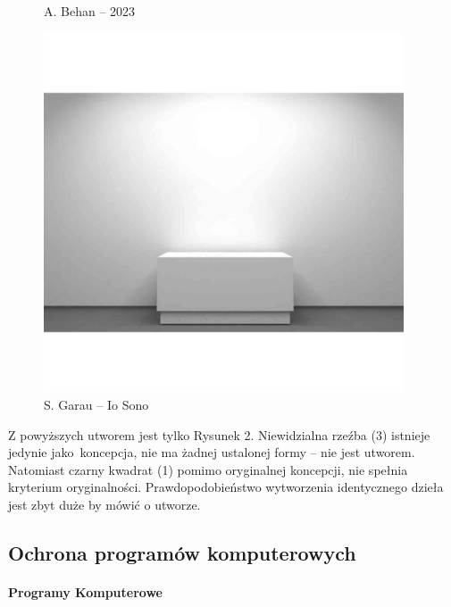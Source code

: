 \documentclass{article}
\begin{document}
\begin{figure}[h]
\begin{minipage}{0.31\textwidth}
    \vspace{-\baselineskip}
    \caption{A. Behan -- 2023}\label{fig:behandomek}
  \end{minipage}
  \hfill
  \begin{minipage}{0.31\textwidth}
    \includegraphics[width=0.95\textwidth]{iosononiewidzialne}
    \vspace{-\baselineskip}
     \caption{S. Garau -- Io Sono}\label{fig:iosononiewidzialne}
  \end{minipage}
\end{figure}

Z powyższych utworem jest tylko Rysunek 2.
Niewidzialna rzeźba (3) istnieje jedynie jako~koncepcja, nie ma żadnej ustalonej formy -- nie jest utworem.
Natomiast czarny kwadrat (1) pomimo oryginalnej koncepcji, nie spełnia kryterium oryginalności.
Prawdopodobieństwo wytworzenia identycznego dzieła jest zbyt duże by mówić o utworze.

\subsection{Ochrona programów komputerowych}

\paragraph{Programy Komputerowe}
\end{document}
